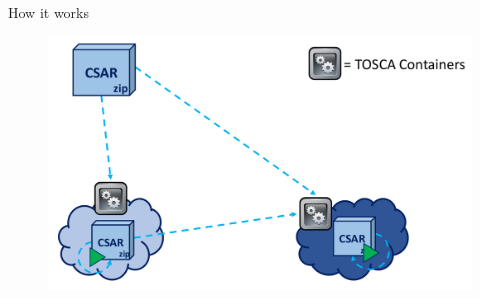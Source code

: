 \documentclass{beamer}
\begin{document}
  \begin{frame}{How it works}
    \begin{figure}
      \includegraphics[width=\textwidth]{img/tosca_how.png}
    \end{figure}
  \end{frame}
\end{document}
